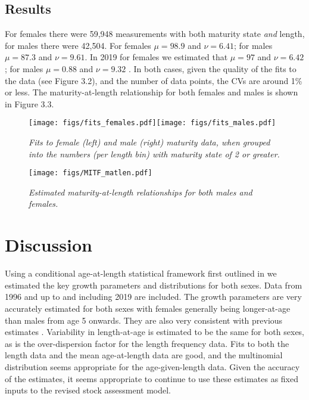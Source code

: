 \documentclass[12pt,a4paper,twoside,times,blue,standard]{csiroreport2017}
\begin{document}
\subsection{Results}

For females there were 59,948 measurements with both maturity state \emph{and} length, for males there were 42,504. For females $\mu=98.9$ and $\nu=6.41$; for males $\mu=87.3$ and $\nu=9.61$. In 2019 for females we estimated that $\mu=97$ and $\nu=6.42$; for males $\mu=0.88$ and $\nu=9.32$ \cite{mimat}. In both cases, given the quality of the fits to the data (see Figure 3.2), and the number of data points, the CVs are around 1\% or less. The maturity-at-length relationship for both females and males is shown in Figure 3.3. 

\begin{figure}[h]
    \begin{center}
        \texttt{[image: figs/fits\_females.pdf]}\texttt{[image: figs/fits\_males.pdf]}
    \end{center}
    \caption{\textit{Fits to female (left) and male (right) maturity data, when grouped into the numbers (per length bin) with maturity state of 2 or greater.}}
\end{figure}

\begin{figure}[h]
    \begin{center}
        \texttt{[image: figs/MITF\_matlen.pdf]}
    \end{center}
    \caption{\textit{Estimated maturity-at-length relationships for both males and females.}}
\end{figure}

\section{Discussion}

Using a conditional age-at-length statistical framework first outlined in \cite{maccag} we estimated the key growth parameters and distributions for both sexes. Data from 1996 and up to and including 2019 are included. The growth parameters are very accurately estimated for both sexes with females generally being longer-at-age than males from age 5 onwards. They are also very consistent with previous estimates \cite{migrowth}. Variability in length-at-age is estimated to be the same for both sexes, as is the over-dispersion factor for the length frequency data. Fits to both the length data and the mean age-at-length data are good, and the multinomial distribution seems appropriate for the age-given-length data. Given the accuracy of the estimates, it seems appropriate to continue to use these estimates as fixed inputs to the revised stock assessment model.
\end{document}
